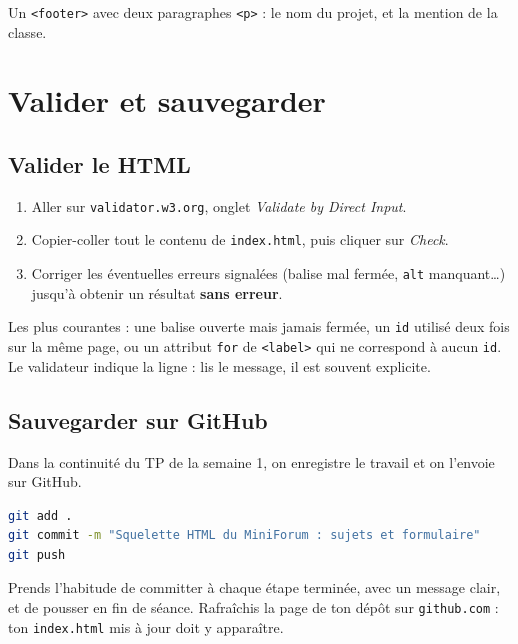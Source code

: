 \documentclass[a4paper,11pt]{article}
\begin{document}
\begin{tcolorbox}[definition, title={À produire}]
Un \texttt{<footer>} avec deux paragraphes \texttt{<p>} : le nom du projet, et la mention de la classe.
\end{tcolorbox}

\section{Valider et sauvegarder}

\subsection{Valider le HTML}

\begin{enumerate}
  \item Aller sur \texttt{validator.w3.org}, onglet \textit{Validate by Direct Input}.
  \item Copier-coller tout le contenu de \texttt{index.html}, puis cliquer sur \textit{Check}.
  \item Corriger les éventuelles erreurs signalées (balise mal fermée, \texttt{alt} manquant\dots) jusqu'à obtenir un résultat \textbf{sans erreur}.
\end{enumerate}

\begin{tcolorbox}[astuce, title={Erreurs fréquentes}]
Les plus courantes : une balise ouverte mais jamais fermée, un \texttt{id} utilisé deux fois sur la même page, ou un attribut \texttt{for} de \texttt{<label>} qui ne correspond à aucun \texttt{id}. Le validateur indique la ligne : lis le message, il est souvent explicite.
\end{tcolorbox}

\subsection{Sauvegarder sur GitHub}

Dans la continuité du TP de la semaine 1, on enregistre le travail et on l'envoie sur GitHub.

\begin{lstlisting}[language=bash]
git add .
git commit -m "Squelette HTML du MiniForum : sujets et formulaire"
git push
\end{lstlisting}

\begin{tcolorbox}[astuce, title={Le bon réflexe}]
Prends l'habitude de committer à chaque étape terminée, avec un message clair, et de pousser en fin de séance. Rafraîchis la page de ton dépôt sur \texttt{github.com} : ton \texttt{index.html} mis à jour doit y apparaître.
\end{tcolorbox}
\end{document}
